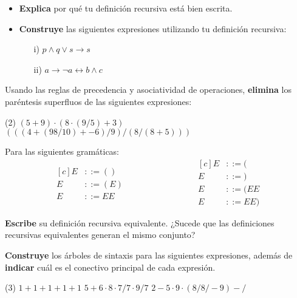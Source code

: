 \documentclass[oneside]{style}
\begin{document}
\begin{questions}[label=\protect\circled{\bfseries\arabic*}]
{\begin{itemize}
            \item \textbf{Explica} por qué tu definición recursiva está bien 
            escrita. 

            \item \textbf{Construye} las siguientes expresiones utilizando tu 
            definición recursiva:
            \begin{itemize}
                \item[i)] $p \land q \lor s \rightarrow s$
                \item[ii)] $a \rightarrow \neg a \leftrightarrow b \land c$ 
            \end{itemize}
        \end{itemize}
    }

    \newpage
    \question
    {
        Usando las reglas de precedencia y asociatividad de operaciones, 
        \textbf{elimina} los paréntesis superfluos de las siguientes 
        expresiones:
        \begin{tasks}(2)
            \task $(5 + 9) \cdot (8 \cdot (9 / 5) + 3)$
            \task $(((4 + (98 / 10) + -6) / 9)/(8 / (8 + 5)))$
        \end{tasks}
    }

    \question
    {
        Para las siguientes gramáticas:
        \begin{equation*}
            \begin{aligned}[c]
                E &::= () \\
                E &::= (E) \\
                E &::= EE
            \end{aligned}
            \qquad \qquad \qquad \qquad
            \begin{aligned}[c]
                E &::= ( \\
                E &::= ) \\
                E &::= (EE \\ 
                E &::= EE) 
            \end{aligned}
        \end{equation*}

        \textbf{Escribe} su definición recursiva equivalente. ¿Sucede que las 
        definiciones recursivas equivalentes generan el mismo conjunto? 
    }

    \question
    {
        \textbf{Construye} los árboles de sintaxis para las siguientes 
        expresiones, además de \textbf{indicar} cuál es el conectivo principal 
        de cada expresión. 
        \begin{tasks}(3)
            \task $1 + 1 + 1 + 1 + 1$
            \task $5 + 6 \cdot 8 \cdot 7 / 7 \cdot 9 / 7$
            \task $2 - 5 \cdot 9 \cdot (8 / 8 / -9)-/$
        \end{tasks}
    }


\end{questions}
\end{document}
